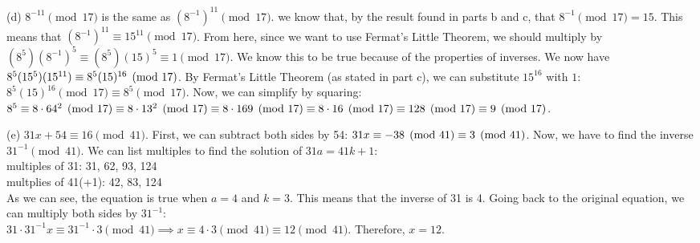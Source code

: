 \documentclass[11pt]{article}
\begin{document}
\begin{solution}
    \medskip\noindent
    (d) $8^{-11}\pmod{17}$ is the same 
        as $(8^{-1})^{11}\pmod{17}$.
        we know that, by the result 
        found in parts b and c,
        that $8^{-1}\pmod{17} = 15$.
        This means that
        $(8^{-1})^{11}
        \equiv 15^{11} \pmod{17}$. 
        From here, since we want to use Fermat's 
        Little Theorem, we should multiply by 
        $(8^5)(8^{-1})^{5} \equiv (8^5)(15)^{5} 
        \equiv 1\pmod{17}$.
        We know this to be true because of the properties
        of inverses. We now have
        $8^5(15^5)(15^{11})
        \\\equiv 8^5(15)^{16}\pmod{17}$. By Fermat's 
        Little Theorem (as stated in part c),
        we can substitute $15^{16}$ with $1$: 
        $8^5(15)^{16}\pmod{17} 
        \equiv 8^5\pmod{17}$. Now, we can simplify
        by squaring:
        \\ $8^5 \equiv 8 \cdot 64^2\pmod{17}
        \\ \equiv 8 \cdot 13^2\pmod{17}
        \\ \equiv 8 \cdot 169\pmod{17}
        \\ \equiv 8 \cdot 16\pmod{17}
        \\ \equiv 128\pmod{17}
        \\ \equiv 9\pmod{17}
        $.

        \pagebreak
        \medskip\noindent
        (e) $31x+54\equiv16\pmod{41}$. 
        First, we can subtract both sides 
        by 54: $31x\equiv-38\pmod{41}
        \\\equiv3\pmod{41}$. Now, we have to find
        the inverse $31^{-1}\pmod{41}$. We can list
        multiples to find the solution of
        $31a = 41k + 1$: 
        \\ multiples of 31: 31, 62, 93, 124
        \\ multplies of 41(+1): 42, 83, 124
        \\ As we can see, the equation is true 
        when $a=4$ and $k=3$. This means that the
        inverse of 31 is 4. Going back to the 
        original equation, we can multiply
        both sides by $31^{-1}$: 
        \\ $31 \cdot 31^{-1}x 
        \equiv 31^{-1}\cdot 3\pmod{41}
        \implies x \equiv 4 \cdot 3 \pmod{41}
        \equiv 12 \pmod{41}
        $. Therefore, $x=12$.



    
    
    
\end{solution}
\end{document}
